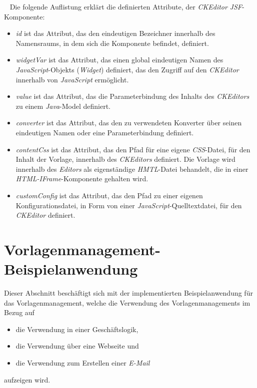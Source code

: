 \ \newline
Die folgende Auflistung erklärt die definierten Attribute, der \emph{CKEditor} \emph{JSF}-Komponente:
\begin{itemize}
	\item\emph{id} ist das Attribut, das den eindeutigen Bezeichner innerhalb des Namensraums, in dem sich die Komponente befindet, definiert.
	\item\emph{widgetVar} ist das Attribut, das einen global eindeutigen Namen des \emph{JavaScript}-Objekts (\emph{Widget}) definiert, das den Zugriff auf den \emph{CKEditor} innerhalb von \emph{JavaScript} ermöglicht.
	\item\emph{value} ist das Attribut, das die Parameterbindung des Inhalts des \emph{CKEditors} zu einem \emph{Java}-Model definiert.
	\item\emph{converter} ist das Attribut, das den zu verwendeten Konverter über seinen eindeutigen Namen oder eine Parameterbindung definiert.
	\item\emph{contentCss} ist das Attribut, das den Pfad für eine eigene \emph{CSS}-Datei, für den Inhalt der Vorlage, innerhalb des \emph{CKEditors} definiert. Die Vorlage wird innerhalb des \emph{Editors} als eigenständige \emph{HMTL}-Datei behandelt, die in einer \emph{HTML-IFrame}-Komponente gehalten wird.
	\item\emph{customConfig} ist das Attribut, das den Pfad zu einer eigenen Konfigurationsdatei, in Form von einer \emph{JavaScript}-Quelltextdatei, für den \emph{CKEditor} definiert.
\end{itemize}

\section{Vorlagenmanagement-Beispielanwendung}
Dieser Abschnitt beschäftigt sich mit der implementierten Beispielanwendung für das Vorlagenmanagement, welche die Verwendung des Vorlagenmanagements im Bezug auf 
\begin{itemize}
	\item die Verwendung in einer Geschäftslogik,
	\item die Verwendung über eine Webseite und
	\item die Verwendung zum Erstellen einer \emph{E-Mail} 
\end{itemize}
aufzeigen wird. 

